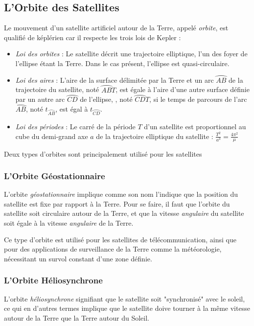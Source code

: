 \documentclass[a4paper, 10pt]{report}
\begin{document}
\subsection{L'Orbite des Satellites}
Le mouvement d'un satellite artificiel autour de la Terre, appelé \emph{orbite}, est qualifié de képlérien car il respecte les trois lois de Kepler :
\begin{itemize}
	\item \emph{Loi des orbites} : Le satellite décrit une trajectoire elliptique, l'un des foyer de l'ellipse étant la Terre. Dans le cas présent, l'ellipse est quasi-circulaire.
	\item \emph{Loi des aires} : L'aire de la surface délimitée par la Terre et un arc $\wideparen{AB}$ de la trajectoire du satellite, noté $\wideparen{AB}T$, est égale à l'aire d'une autre surface définie par un autre arc $\wideparen{CD}$ de l'ellipse, , noté $\wideparen{CD}T$, si le temps de parcours de l'arc $\wideparen{AB}$, noté $t_{\wideparen{AB}}$, est égal à $t_{\wideparen{CD}}$.
	\item \emph{Loi des périodes} : Le carré de la période $T$ d'un satellite est proportionnel au cube du demi-grand axe $a$ de la trajectoire elliptique du satellite : $\frac{T^2}{a^3} = \frac{4 \pi^2}{\mu}$
\end{itemize}
Deux types d'orbites sont principalement utilisé pour les satellites
\subsubsection{L'Orbite Géostationnaire}
L'orbite \emph{géostationnaire} implique comme son nom l'indique que la position du satellite est fixe par rapport à la Terre.
Pour se faire, il faut que l'orbite du satellite soit circulaire autour de la Terre, et que la vitesse \emph{angulaire} du satellite soit égale à la vitesse \emph{angulaire} de la Terre.

Ce type d'orbite est utilisé pour les satellites de télécommunication, ainsi que pour des applications de surveillance de la Terre comme la météorologie, nécessitant un survol constant d'une zone définie.
\subsubsection{L'Orbite Héliosynchrone}
L'orbite \emph{héliosynchrone} signifiant que le satellite soit "synchronisé" avec le soleil, ce qui en d'autres termes implique que le satellite doive tourner à la même vitesse autour de la Terre que la Terre autour du Soleil.
\end{document}
